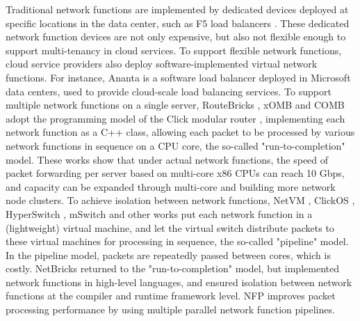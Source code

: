 Traditional network functions are implemented by dedicated devices deployed at specific locations in the data center, such as F5 load balancers \cite{f5-load-balancer}. These dedicated network function devices are not only expensive, but also not flexible enough to support multi-tenancy in cloud services.
To support flexible network functions, cloud service providers also deploy software-implemented virtual network functions. For instance, Ananta \cite {ananta} is a software load balancer deployed in Microsoft data centers, used to provide cloud-scale load balancing services.
To support multiple network functions on a single server, RouteBricks \cite {routebricks}, xOMB \cite{anderson2012xomb} and COMB \cite{comb} adopt the programming model of the Click modular router \cite{kohler2000click}, implementing each network function as a C++ class, allowing each packet to be processed by various network functions in sequence on a CPU core, the so-called "run-to-completion" model.
These works show that under actual network functions, the speed of packet forwarding per server based on multi-core x86 CPUs can reach 10 Gbps, and capacity can be expanded through multi-core and building more network node clusters.
To achieve isolation between network functions, NetVM \cite{hwang2015netvm}, ClickOS \cite{martins2014clickos}, HyperSwitch \cite{ram2013hyper}, mSwitch \cite{eisenbud2016maglev} and other works put each network function in a (lightweight) virtual machine, and let the virtual switch distribute packets to these virtual machines for processing in sequence, the so-called "pipeline" model.
In the pipeline model, packets are repeatedly passed between cores, which is costly.
NetBricks \cite{netbricks} returned to the "run-to-completion" model, but implemented network functions in high-level languages, and ensured isolation between network functions at the compiler and runtime framework level.
NFP \cite{sun2017nfp} improves packet processing performance by using multiple parallel network function pipelines.

